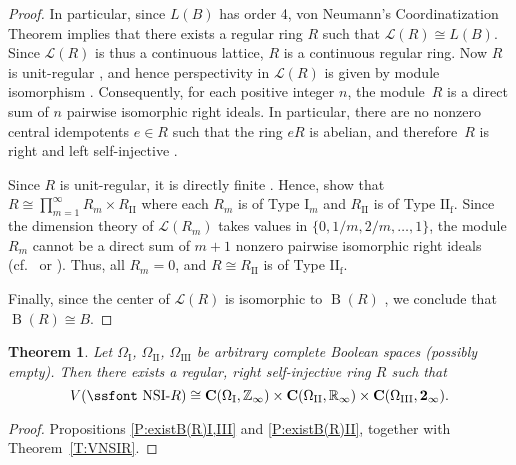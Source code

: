 \documentclass[psamsfonts,reqno]{memo-l}
\theoremstyle{plain}
\newtheorem{theorem}[lemma]{Theorem}
\theoremstyle{definition}
\theoremstyle{remark}
\numberwithin{equation}{section}
\newcommand{\two}{\mathbf{2}}
\newcommand{\CC}{\mathbf{C}}
\DeclareMathOperator{\rB}{B}
\newcommand{\I}{\mathrm{I}}
\newcommand{\II}{\mathrm{II}}
\newcommand{\III}{\mathrm{III}}
\newcommand{\pup}[1]{\textup{(}{#1}\textup{)}}
\newcommand{\ZZ}{\mathbb{Z}}
\newcommand{\RR}{\mathbb{R}}
\newcommand{\set}[1]{\{#1\}}
\newcommand{\Lat}{\mathcal{L}}
\newcommand{\NSIR}{\mbox{\ssfont NSI-}R}
\newcommand{\IIf}{${\II}_{\mathrm{f}}$}
\begin{document}
\begin{proof}
In particular, since $L(B)$ has order 4, von Neumann's
Coordinatization Theorem implies that there exists a regular ring
$R$ such that $\Lat(R)\cong L(B)$. Since $\Lat(R)$ is thus a
continuous lattice, $R$ is a continuous
 regular
ring. Now $R$ is unit-regular
\cite[Corollary 13.23]{GvnRR}, and hence
perspectivity in
$\Lat(R)$ is given by module isomorphism \cite[Corollary 4.23]{GvnRR}.
Consequently, for each positive integer $n$, the module~$R$ is a direct
sum of $n$ pairwise isomorphic right ideals. In particular, there are no
nonzero central idempotents $e\in R$ such that the ring $eR$ is
abelian, and therefore~$R$ is right and left self-injective
%
\cite[Corollary 13.18]{GvnRR}.

Since $R$ is unit-regular, it is directly finite
\cite[Proposition~5.2]{GvnRR}. Hence,
\cite[Theorems 10.13, 10.24]{GvnRR} show that $R\cong \prod_{m=1}^\infty
R_m\times R_{\II}$ where each $R_m$ is of Type I$_m$ and $R_{\II}$ is of
Type \IIf. Since the dimension theory of $\Lat(R_m)$ takes values in
$\set{0,1/m,2/m,\dots,1}$, the module $R_m$ cannot be a direct sum of $m+1$
nonzero pairwise isomorphic right ideals (cf.~\cite[Theorem~10.10]{GoBo}
%
or \cite[Corollary 11.18]{GvnRR}). Thus, all $R_m=0$,
and $R\cong R_{\II}$ is of Type \IIf.

Finally, since the center of $\Lat(R)$ is isomorphic to $\rB(R)$
\cite[Chapter VI, S\"atze 1.9, 3.5]{FMae55}, we conclude
that $\rB(R)\cong B$.
\end{proof}


\begin{theorem}\label{T:arbVNSIR}
Let $\Omega_{\I}$, $\Omega_{\II}$, $\Omega_{\III}$ be arbitrary complete
Boolean spaces \pup{possibly empty}.
Then there exists a regular, right
self-injective ring $R$
%
such that\index{VzzofNSIR@$V(\NSIR)$}
   \[
   V(\NSIR)\cong \CC(\Omega_{\I},\ZZ_\infty)\times
   \CC(\Omega_{\II},\RR_\infty)\times \CC(\Omega_{\III},\two_\infty).
   \]
\end{theorem}

\begin{proof} Propositions \ref{P:existB(R)I,III} and
\ref{P:existB(R)II}, together with Theorem~\ref{T:VNSIR}.
\end{proof}
\end{document}
